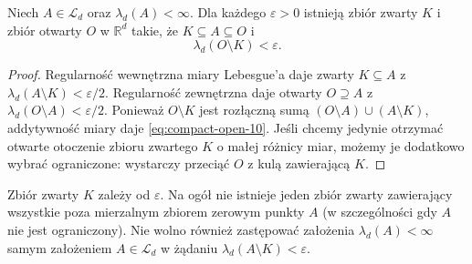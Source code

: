 \begin{lemat}
\label{lem:compact-inside-10}
Niech $A\in\mathcal L_d$ oraz $\lambda_d(A)<\infty$.
Dla każdego $\varepsilon>0$ istnieją zbiór
zwarty $K$ i zbiór otwarty $O$ w $\mathbb R^d$ takie,
że $K\subseteq A\subseteq O$ i
\begin{equation}\label{eq:compact-open-10}
\lambda_d(O\setminus K)<\varepsilon.
\end{equation}
\end{lemat}
\begin{proof}
Regularność wewnętrzna miary Lebesgue'a daje
zwarty $K\subseteq A$ z
$\lambda_d(A\setminus K)<\varepsilon/2$.
Regularność zewnętrzna daje otwarty $O\supseteq A$
z $\lambda_d(O\setminus A)<\varepsilon/2$.
Ponieważ $O\setminus K$ jest rozłączną sumą
$(O\setminus A)\cup(A\setminus K)$,
addytywność miary daje \eqref{eq:compact-open-10}.
Jeśli chcemy jedynie otrzymać otwarte otoczenie
zbioru zwartego $K$ o małej różnicy miar,
możemy je dodatkowo wybrać ograniczone:
wystarczy przeciąć $O$ z kulą zawierającą $K$.
\end{proof}

\begin{uwaga}
Zbiór zwarty $K$ zależy od $\varepsilon$.
Na ogół nie istnieje jeden zbiór zwarty zawierający
wszystkie poza mierzalnym zbiorem zerowym punkty
$A$ (w szczególności gdy $A$ nie jest ograniczony).
Nie wolno również zastępować założenia
$\lambda_d(A)<\infty$ samym założeniem
$A\in\mathcal L_d$ w żądaniu
$\lambda_d(A\setminus K)<\varepsilon$.
\end{uwaga}

